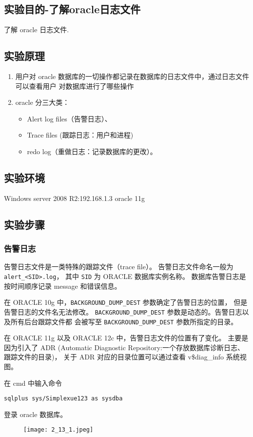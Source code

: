 \subsection{实验目的-了解oracle日志文件}
了解 oracle 日志文件.
%
\subsection{实验原理}
\begin{enumerate}
  \item 用户对 oracle 数据库的一切操作都记录在数据库的日志文件中，通过日志文件可以查看用户
    对数据库进行了哪些操作
  \item oracle 分三大类：
    \begin{itemize}
      \item Alert log files（告警日志）、
      \item Trace files (跟踪日志：用户和进程)
      \item redo log（重做日志：记录数据库的更改）。
    \end{itemize}
\end{enumerate}
%
\subsection{实验环境}
Windows server 2008 R2:192.168.1.3 oracle 11g
%
\subsection{实验步骤}
\subsubsection{告警日志}
告警日志文件是一类特殊的跟踪文件（trace file）。
告警日志文件命名一般为 \texttt{alert\_<SID>.log}，
其中 \texttt{SID} 为 ORACLE 数据库实例名称。
数据库告警日志是按时间顺序记录 message 和错误信息。

在 ORACLE 10g 中，\texttt{BACKGROUND\_DUMP\_DEST} 参数确定了告警日志的位置，
但是告警日志的文件名无法修改。
\texttt{BACKGROUND\_DUMP\_DEST} 参数是动态的。告警日志以及所有后台跟踪文件都
会被写至 \texttt{BACKGROUND\_DUMP\_DEST} 参数所指定的目录。

在 ORACLE 11g 以及 ORACLE 12c 中，告警日志文件的位置有了变化。
主要是因为引入了 ADR
(Automatic Diagnostic Repository:一个存放数据库诊断日志、跟踪文件的目录)，
关于 ADR 对应的目录位置可以通过查看 v\$diag\_info 系统视图。

在 cmd 中输入命令
\begin{verbatim}
sqlplus sys/Simplexue123 as sysdba
\end{verbatim}
登录 oracle 数据库。
\begin{figure}[H]
  \begin{center}
    \texttt{[image: 2\_13\_1.jpeg]}
  \end{center}
\end{figure}

